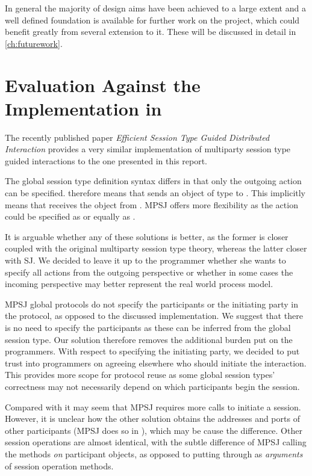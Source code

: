 In general the majority of design aims have been achieved to a large extent and a well defined foundation is available for further work on the project, which could benefit greatly from several extension to it. These will be discussed in detail in \autoref{ch:futurework}.


\section{Evaluation Against the Implementation in \cite{sess_type_guided_distr_interact}}

The recently published paper \textit{Efficient Session Type Guided Distributed Interaction} provides a very similar implementation of multiparty session type guided interactions to the one presented in this report. 

The global session type definition syntax differs in that only the outgoing action can be specified.  therefore means that  sends an object of type  to . This implicitly means that  receives the object from . MPSJ offers more flexibility as the action could be specified as  or equally as . 

It is arguable whether any of these solutions is better, as the former is closer coupled with the original multiparty session type theory, whereas the latter closer with SJ. We decided to leave it up to the programmer whether she wants to specify all actions from the outgoing perspective or whether in some cases the incoming perspective may better represent the real world process model.

MPSJ global protocols do not specify the participants or the initiating party in the protocol, as opposed to the discussed implementation. We suggest that there is no need to specify the participants as these can be inferred from the global session type. Our solution therefore removes the additional burden put on the programmers. With respect to specifying the initiating party, we decided to put trust into programmers on agreeing elsewhere who should initiate the interaction. This provides more scope for protocol reuse as some global session types' correctness may not necessarily depend on which participants begin the session.

Compared with \cite{sess_type_guided_distr_interact} it may seem that MPSJ requires more calls to initiate a session. However, it is unclear how the other solution obtains the addresses and ports of other participants (MPSJ does so in ), which may be cause the difference. Other session operations are almost identical, with the subtle difference of MPSJ calling the methods \textit{on} participant objects, as opposed to putting through as \textit{arguments} of session operation methods.

